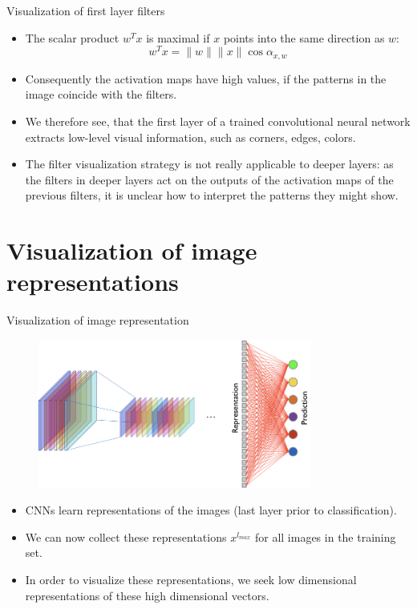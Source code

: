 \documentclass[xcolor=pdftex,dvipsnames,table]{beamer}
\begin{document}
\begin{frame}{Visualization of first layer filters}
\begin{itemize}
	\item The scalar product $w^Tx$ is maximal if $x$ points into the same direction as $w$:
	\begin{equation*}
	w^Tx = \|w\|\|x\|\cos{\alpha_{x,w}}
	\end{equation*}
	\item Consequently the activation maps have high values, if the patterns in the image coincide with the filters. 
	\item We therefore see, that the first layer of a trained convolutional neural network extracts low-level visual information, such as corners, edges, colors. 
	\item The filter visualization strategy is not really applicable to deeper layers: as the filters in deeper layers act on the outputs of the activation maps of the previous filters, it is unclear how to interpret the patterns they might show.
\end{itemize}
\end{frame}

\section{Visualization of image representations}

\begin{frame}{Visualization of image representation}
\begin{figure}[htb]
\includegraphics[width=0.8\textwidth]{../graphics/Vis_last_layer.png}
\end{figure}
\begin{itemize}
	\item CNNs learn representations of the images (last layer prior to classification).  
	\item We can now collect these representations $x^{l_{max}}$ for all images in the training set. 
	\item In order to visualize these representations, we seek low dimensional representations of these high dimensional vectors. 
\end{itemize}
\end{frame}
\end{document}
